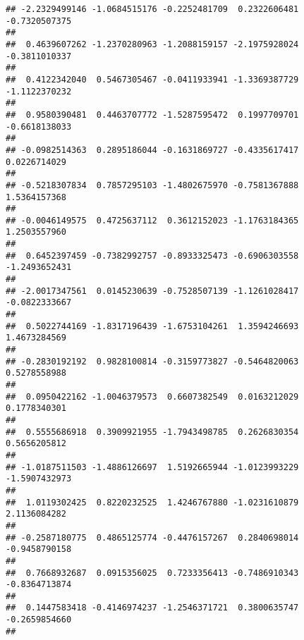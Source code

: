 \documentclass[]{article}
\begin{document}
\begin{verbatim}
## -2.2329499146 -1.0684515176 -0.2252481709  0.2322606481 -0.7320507375 
##                                                                       
##  0.4639607262 -1.2370280963 -1.2088159157 -2.1975928024 -0.3811010337 
##                                                                       
##  0.4122342040  0.5467305467 -0.0411933941 -1.3369387729 -1.1122370232 
##                                                                       
##  0.9580390481  0.4463707772 -1.5287595472  0.1997709701 -0.6618138033 
##                                                                       
## -0.0982514363  0.2895186044 -0.1631869727 -0.4335617417  0.0226714029 
##                                                                       
## -0.5218307834  0.7857295103 -1.4802675970 -0.7581367888  1.5364157368 
##                                                                       
## -0.0046149575  0.4725637112  0.3612152023 -1.1763184365  1.2503557960 
##                                                                       
##  0.6452397459 -0.7382992757 -0.8933325473 -0.6906303558 -1.2493652431 
##                                                                       
## -2.0017347561  0.0145230639 -0.7528507139 -1.1261028417 -0.0822333667 
##                                                                       
##  0.5022744169 -1.8317196439 -1.6753104261  1.3594246693  1.4673284569 
##                                                                       
## -0.2830192192  0.9828100814 -0.3159773827 -0.5464820063  0.5278558988 
##                                                                       
##  0.0950422162 -1.0046379573  0.6607382549  0.0163212029  0.1778340301 
##                                                                       
##  0.5555686918  0.3909921955 -1.7943498785  0.2626830354  0.5656205812 
##                                                                       
## -1.0187511503 -1.4886126697  1.5192665944 -1.0123993229 -1.5907432973 
##                                                                       
##  1.0119302425  0.8220232525  1.4246767880 -1.0231610879  2.1136084282 
##                                                                       
## -0.2587180775  0.4865125774 -0.4476157267  0.2840698014 -0.9458790158 
##                                                                       
##  0.7668932687  0.0915356025  0.7233356413 -0.7486910343 -0.8364713874 
##                                                                       
##  0.1447583418 -0.4146974237 -1.2546371721  0.3800635747 -0.2659854660 
##                                                                       

\end{verbatim}
\end{document}
